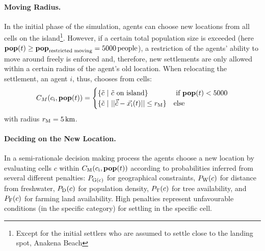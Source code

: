 \paragraph{Moving Radius.}
In the initial phase of the simulation, agents can choose new locations from all cells on the island\footnote{Except for the initial settlers who are assumed to settle close to the landing spot, Anakena Beach}.
However, if a certain total population size is exceeded (here $\mathbf{pop}(t)\geq \mathbf{pop}_\text{restricted moving} = 5000 \, \rm{people}$), a restriction of the agents' ability to move around freely is enforced and, therefore, new settlements are only allowed within a certain radius of the agent's old location.
When relocating the settlement, an agent $i$, thus, chooses from cells:
\begin{equation}
C_{M}(c_{\rm i}, \mathbf{pop}(t)) = 
\begin{cases}
\{\tilde{c} \ | \ \tilde{c}\text{ on island}\} & \text{ if } \mathbf{pop}(t) <5000 \\
\{\tilde{c} \ | \ | | \vec{\tilde{c}} - \vec{x_{\rm i}}(t) | |
\leq r_{\rm M} \} & \text{else} 
\end{cases}
\end{equation}
with radius $r_{\rm M} = 5\, {\rm km}$.

\paragraph{Deciding on the New Location.}
In a semi-rationale decision making process the agents choose a new location by evaluating cells $c$ within $C_{\rm M} (c_{\rm i}, \mathbf{pop}(t))$ according to probabilities inferred from several different penalties:
$P_{\rm G(c)}$ for geographical constraints, $P_{\rm W}(c)$ for distance from freshwater, $P_{\rm D}(c)$ for population density, $P_{\rm T}(c)$ for tree availability, and $P_{\rm F}(c)$ for farming land availability.
High penalties represent unfavourable conditions (in the specific category) for settling in the specific cell.


